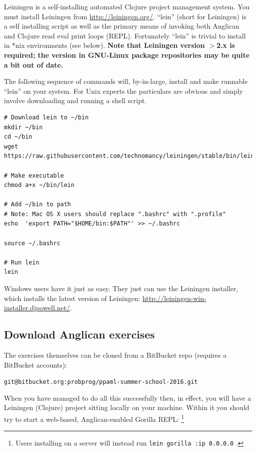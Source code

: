 \documentclass{article}
\begin{document}
Leiningen is a self-installing automated Clojure project management system.  
You must install Leiningen from \url{http://leiningen.org/}.  ``lein'' 
(short for Leiningen) is a self installing script as well as the primary means
of invoking both Anglican and Clojure read eval print loops (REPL).  Fortunately
``lein'' is trivial to install in *nix environments (see below).
\textbf{ Note that Leiningen version $>$2.x is required; the version in  
GNU-Linux package repositories may be quite a bit out of date.}

The following sequence of commands will, by-in-large, install and make runnable ``lein'' on your system.  For Unix experts the particulars are obvious and simply involve downloading and running a shell script.

\begin{verbatim}
# Download lein to ~/bin
mkdir ~/bin
cd ~/bin
wget https://raw.githubusercontent.com/technomancy/leiningen/stable/bin/lein

# Make executable
chmod a+x ~/bin/lein

# Add ~/bin to path
# Note: Mac OS X users should replace ".bashrc" with ".profile"
echo  'export PATH="$HOME/bin:$PATH"' >> ~/.bashrc 

source ~/.bashrc

# Run lein
lein
\end{verbatim}

\noindent Windows users have it just as easy. They just can use the Leiningen installer, which installs the latest version of Leiningen: \url{http://leiningen-win-installer.djpowell.net/}.

\subsection{Download Anglican exercises}

The exercises themselves can be cloned from a BitBucket repo (requires a BitBucket accounts):

\vspace{5mm}

\texttt{git@bitbucket.org:probprog/ppaml-summer-school-2016.git}

\newpage
When you have managed to do all this successfully then, in effect, you will have a 
Leiningen (Clojure) project sitting locally on your machine.   Within it  
you should try to start a web-based, Anglican-enabled Gorilla REPL:
\footnote{Users installing on a server will instead run \texttt{lein gorilla :ip 0.0.0.0} .}
\end{document}
